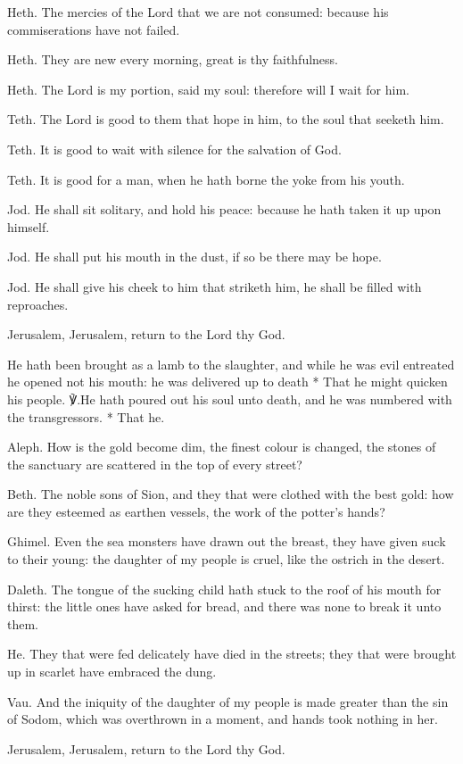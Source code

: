 \documentclass[12pt]{book}
\begin{document}
\silently

\altlarge
{}
\altitshape

\begin{enpars}
Heth. The mercies of the Lord that we are not consumed: because his commiserations have not failed.

Heth. They are new every morning, great is thy faithfulness.

Heth. The Lord is my portion, said my soul: therefore will I wait for him.

Teth. The Lord is good to them that hope in him, to the soul that seeketh him.

Teth. It is good to wait with silence for the salvation of God.

Teth. It is good for a man, when he hath borne the yoke from his youth.

Jod. He shall sit solitary, and hold his peace: because he hath taken it up upon himself.

Jod. He shall put his mouth in the dust, if so be there may be hope.

Jod. He shall give his cheek to him that striketh him, he shall be filled with reproaches.

Jerusalem, Jerusalem, return to the Lord thy God.
\end{enpars}

%
\begin{enpars}
He hath been brought as a lamb to the slaughter, and while he was evil entreated he opened not his mouth: he was delivered up to death
* That he might quicken his people.
℣.\@  He hath poured out his soul unto death, and he was numbered with the transgressors.
*  That he.
\end{enpars}

\begin{enpars}
Aleph. How is the gold become dim, the finest colour is changed, the stones of the sanctuary are scattered in the top of every street?

Beth. The noble sons of Sion, and they that were clothed with the best gold: how are they esteemed as earthen vessels, the work of the potter's hands?

Ghimel. Even the sea monsters have drawn out the breast, they have given suck to their young: the daughter of my people is cruel, like the ostrich in the desert.

Daleth. The tongue of the sucking child hath stuck to the roof of his mouth for thirst: the little ones have asked for bread, and there was none to break it unto them.

He. They that were fed delicately have died in the streets; they that were brought up in scarlet have embraced the dung.

Vau. And the iniquity of the daughter of my people is made greater than the sin of Sodom, which was overthrown in a moment, and hands took nothing in her.

Jerusalem, Jerusalem, return to the Lord thy God.
\end{enpars}
\end{document}

